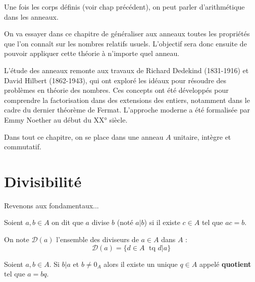 
\minitoc  %

Une fois les corps définis (voir chap précédent), on peut parler d'arithmétique dans les anneaux. 

On va essayer dans ce chapitre de généraliser aux anneaux toutes les propriétés que l'on connaît sur les 
nombres relatifs usuels. L'objectif sera donc ensuite de pouvoir appliquer cette théorie à n'importe quel anneau. 

L’étude des anneaux remonte aux travaux de Richard Dedekind (1831-1916) 
et David Hilbert (1862-1943), qui ont exploré les idéaux pour résoudre des problèmes en théorie des nombres. 
Ces concepts ont été développés pour comprendre la factorisation dans des extensions des entiers, 
notamment dans le cadre du dernier théorème de Fermat. L’approche moderne a été formalisée par Emmy Noether 
au début du XX° siècle.

\vspace{0.3cm}

Dans tout ce chapitre, on se place dans une anneau $A$ unitaire, intègre et commutatif. 


\section{Divisibilité}

Revenons aux fondamentaux...

\begin{definition}[Divisibilité]
    Soient $a,b \in A$ on dit que $a$ divise $b$ (noté $a | b$) si il existe $c \in A$ tel que $ac = b$. 

    On note $ \mathcal{D}(a)$ l'ensemble des diviseurs de $a \in A$ dans $A$ : 
        \[ \mathcal{D}(a) = \{d \in A \; \text{ tq } d | a\}  \] 
\end{definition}

\begin{proposition}[Unicité]
    Soient $a,b \in A$. Si $b | a$ et $ b \not  = 0_A$ alors il existe un unique $q \in A$ appelé \textbf{quotient}
    tel que $a = bq$. 
\end{proposition}

